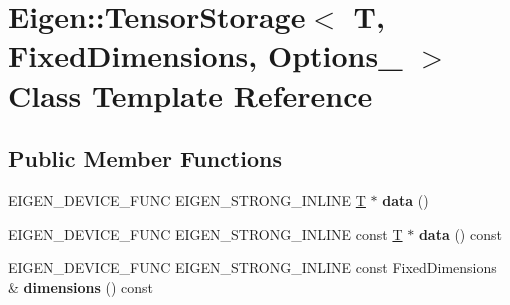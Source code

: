 \hypertarget{class_eigen_1_1_tensor_storage_3_01_t_00_01_fixed_dimensions_00_01_options___01_4}{}\section{Eigen\+:\+:Tensor\+Storage$<$ T, Fixed\+Dimensions, Options\+\_\+ $>$ Class Template Reference}
\label{class_eigen_1_1_tensor_storage_3_01_t_00_01_fixed_dimensions_00_01_options___01_4}
\subsection*{Public Member Functions}
\begin{DoxyCompactItemize}
\item 
\mbox{\label{class_eigen_1_1_tensor_storage_3_01_t_00_01_fixed_dimensions_00_01_options___01_4_a847de4b8dfd51fbeaa075cb70588259f}} 
E\+I\+G\+E\+N\+\_\+\+D\+E\+V\+I\+C\+E\+\_\+\+F\+U\+NC E\+I\+G\+E\+N\+\_\+\+S\+T\+R\+O\+N\+G\+\_\+\+I\+N\+L\+I\+NE \hyperlink{group___sparse_core___module}{T} $\ast$ {\bfseries data} ()
\item 
\mbox{\label{class_eigen_1_1_tensor_storage_3_01_t_00_01_fixed_dimensions_00_01_options___01_4_a8cc65992eafaa8b49cb0077f5a37f4b3}} 
E\+I\+G\+E\+N\+\_\+\+D\+E\+V\+I\+C\+E\+\_\+\+F\+U\+NC E\+I\+G\+E\+N\+\_\+\+S\+T\+R\+O\+N\+G\+\_\+\+I\+N\+L\+I\+NE const \hyperlink{group___sparse_core___module}{T} $\ast$ {\bfseries data} () const
\item 
\mbox{\label{class_eigen_1_1_tensor_storage_3_01_t_00_01_fixed_dimensions_00_01_options___01_4_a96ded02ef2c153df12e49a8905763a22}} 
E\+I\+G\+E\+N\+\_\+\+D\+E\+V\+I\+C\+E\+\_\+\+F\+U\+NC E\+I\+G\+E\+N\+\_\+\+S\+T\+R\+O\+N\+G\+\_\+\+I\+N\+L\+I\+NE const Fixed\+Dimensions \& {\bfseries dimensions} () const
\item 
\mbox{\label{class_eigen_1_1_tensor_storage_3_01_t_00_01_fixed_dimensions_00_01_options___01_4_a29d2bd724aa1855c4114974de5fd5b85}} 

\end{DoxyCompactItemize}

